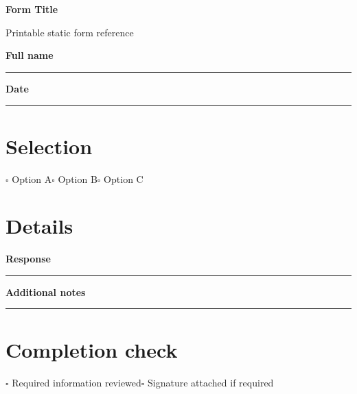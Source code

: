 \documentclass[10.5pt,a4paper]{scrartcl}
\newcommand{\field}[1]{\textbf{#1}\par\vspace{1.2em}\hrule\par}
\begin{document}
{\Huge\bfseries Form Title\par}{\small Printable static form reference\par}\vspace{1em}
\field{Full name}\field{Date}
\section*{Selection}$\square$ Option A\qquad $\square$ Option B\qquad $\square$ Option C
\section*{Details}\field{Response}\field{Additional notes}
\section*{Completion check}$\square$ Required information reviewed\qquad $\square$ Signature attached if required
\end{document}
